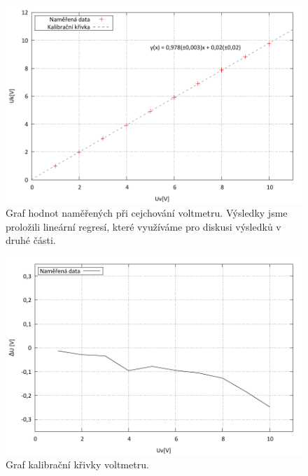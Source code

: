 \documentclass[english]{article}
\begin{document}
\begin{figure}[p]
\begin{center}
    \vspace*{-1cm}
	\includegraphics[width=\linewidth]{../gnuplot/7_kompenzator_cejvolt_out.pdf}
    \vspace*{-1cm}
	\caption{Graf hodnot naměřených při cejchování voltmetru. Výsledky jsme proložili lineární regresí, které využíváme pro diskusi výsledků v druhé části.}
	\label{fig:g_cejchovani_v}
\end{center}
\end{figure}

\begin{figure}[p]
\begin{center}
    \vspace*{-1cm}
    \includegraphics[width=\linewidth]{../gnuplot/7_kompenzator_cejvolt_kalib_out.pdf}
    \vspace*{-1cm}    
	\caption{Graf kalibrační křivky voltmetru.}
	\label{fig:g_cejchovani_v_kalib}
\end{center}
\end{figure}
\end{document}
